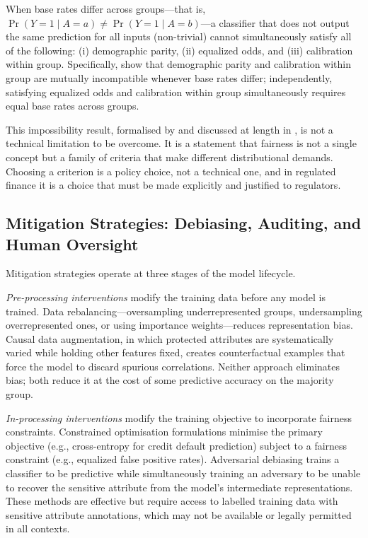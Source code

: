 \begin{context}
\begin{deepdive}
\begin{proposition}
\label{prop:fairness-impossibility}
When base rates differ across groups---that is, $\Pr(Y=1 \mid A=a) \neq \Pr(Y=1 \mid A=b)$---a classifier that does not output the same prediction for all inputs (non-trivial) cannot simultaneously satisfy all of the following:
(i) demographic parity, (ii) equalized odds, and (iii) calibration within group.
Specifically, \citet{chouldechova2017fair} show that demographic parity and calibration within group are mutually incompatible whenever base rates differ; independently, satisfying equalized odds and calibration within group simultaneously requires equal base rates across groups.
\end{proposition}

This impossibility result, formalised by \citet{chouldechova2017fair}
and discussed at length in \cite{kearns2019ethical}, is not a technical limitation to be overcome. It is a statement that fairness is not a single concept but a family of criteria that make different distributional demands. Choosing a criterion is a policy choice, not a technical one, and in regulated finance it is a choice that must be made explicitly and justified to regulators.
\end{deepdive}

\subsection{Mitigation Strategies: Debiasing, Auditing, and Human Oversight}
\label{subsec:af-ethics-mitigation}

Mitigation strategies operate at three stages of the model lifecycle.

\emph{Pre-processing interventions} modify the training data before any model is trained. Data rebalancing---oversampling underrepresented groups, undersampling overrepresented ones, or using importance weights---reduces representation bias. Causal data augmentation, in which protected attributes are systematically varied while holding other features fixed, creates counterfactual examples that force the model to discard spurious correlations. Neither approach eliminates bias; both reduce it at the cost of some predictive accuracy on the majority group.

\emph{In-processing interventions} modify the training objective to incorporate fairness constraints. Constrained optimisation formulations minimise the primary objective (e.g., cross-entropy for credit default prediction) subject to a fairness constraint (e.g., equalized false positive rates). Adversarial debiasing trains a classifier to be predictive while simultaneously training an adversary to be unable to recover the sensitive attribute from the model's intermediate representations. These methods are effective but require access to labelled training data with sensitive attribute annotations, which may not be available or legally permitted in all contexts.


\end{context}

